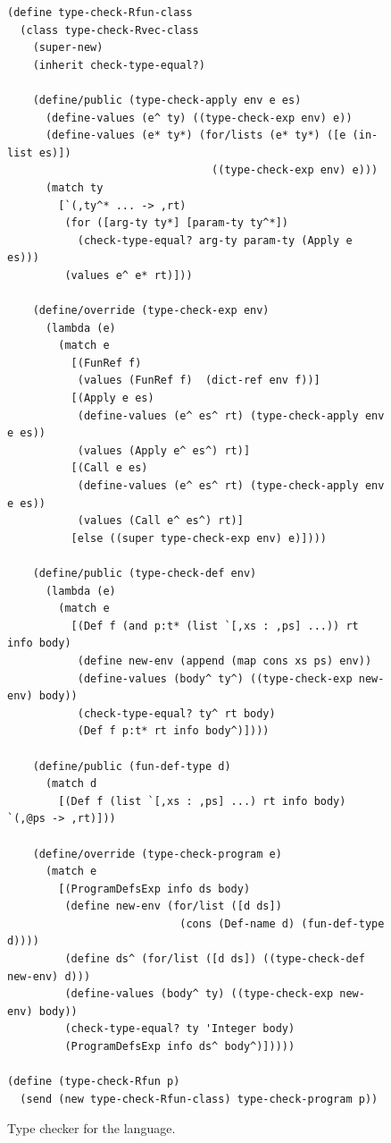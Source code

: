 \documentclass[11pt]{book}
\begin{document}
\begin{figure}[tp]
\begin{lstlisting}[basicstyle=\ttfamily\footnotesize]
(define type-check-Rfun-class
  (class type-check-Rvec-class
    (super-new)
    (inherit check-type-equal?)

    (define/public (type-check-apply env e es)
      (define-values (e^ ty) ((type-check-exp env) e))
      (define-values (e* ty*) (for/lists (e* ty*) ([e (in-list es)])
                                ((type-check-exp env) e)))
      (match ty
        [`(,ty^* ... -> ,rt)
         (for ([arg-ty ty*] [param-ty ty^*])
           (check-type-equal? arg-ty param-ty (Apply e es)))
         (values e^ e* rt)]))

    (define/override (type-check-exp env)
      (lambda (e)
        (match e
          [(FunRef f)
           (values (FunRef f)  (dict-ref env f))]
          [(Apply e es)
           (define-values (e^ es^ rt) (type-check-apply env e es))
           (values (Apply e^ es^) rt)]
          [(Call e es)
           (define-values (e^ es^ rt) (type-check-apply env e es))
           (values (Call e^ es^) rt)]
          [else ((super type-check-exp env) e)])))

    (define/public (type-check-def env)
      (lambda (e)
        (match e
          [(Def f (and p:t* (list `[,xs : ,ps] ...)) rt info body)
           (define new-env (append (map cons xs ps) env))
           (define-values (body^ ty^) ((type-check-exp new-env) body))
           (check-type-equal? ty^ rt body)
           (Def f p:t* rt info body^)])))	 

    (define/public (fun-def-type d)
      (match d
        [(Def f (list `[,xs : ,ps] ...) rt info body)  `(,@ps -> ,rt)]))

    (define/override (type-check-program e)
      (match e
        [(ProgramDefsExp info ds body)
         (define new-env (for/list ([d ds])
                           (cons (Def-name d) (fun-def-type d))))
         (define ds^ (for/list ([d ds]) ((type-check-def new-env) d)))
         (define-values (body^ ty) ((type-check-exp new-env) body))
         (check-type-equal? ty 'Integer body)
         (ProgramDefsExp info ds^ body^)]))))

(define (type-check-Rfun p)
  (send (new type-check-Rfun-class) type-check-program p))
\end{lstlisting}
\caption{Type checker for the \LangFun{} language.}
\label{fig:type-check-Rfun}
\end{figure}
\end{document}
